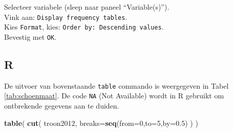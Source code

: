 \documentclass[
]{book}
\newenvironment{Shaded}{\begin{snugshade}}{\end{snugshade}}
\newcommand{\CommentTok}[1]{\textcolor[rgb]{0.56,0.35,0.01}{\textit{#1}}}
\newcommand{\DataTypeTok}[1]{\textcolor[rgb]{0.13,0.29,0.53}{#1}}
\newcommand{\DecValTok}[1]{\textcolor[rgb]{0.00,0.00,0.81}{#1}}
\newcommand{\FloatTok}[1]{\textcolor[rgb]{0.00,0.00,0.81}{#1}}
\newcommand{\KeywordTok}[1]{\textcolor[rgb]{0.13,0.29,0.53}{\textbf{#1}}}
\newcommand{\NormalTok}[1]{#1}
\newcommand{\OperatorTok}[1]{\textcolor[rgb]{0.81,0.36,0.00}{\textbf{#1}}}
\newcommand{\OtherTok}[1]{\textcolor[rgb]{0.56,0.35,0.01}{#1}}
\newcommand{\StringTok}[1]{\textcolor[rgb]{0.31,0.60,0.02}{#1}}
\begin{document}
Selecteer variabele (sleep naar paneel ``Variable(s)'').\\
Vink aan: \texttt{Display\ frequency\ tables}.\\
Kies \texttt{Format}, kies: \texttt{Order\ by:\ Descending\ values}.\\
Bevestig met \texttt{OK}.\\

\hypertarget{r-1}{%
\subsection{R}\label{r-1}}

\begin{Shaded}
\end{Shaded}

De uitvoer van bovenstaande \texttt{table} commando is weergegeven in Tabel \ref{tab:schoenmaat}.
De code \texttt{NA} (Not Available) wordt in R gebruikt om ontbrekende gegevens aan te duiden.

\begin{Shaded}
\end{Shaded}

\begin{Shaded}
\begin{Highlighting}[]
\KeywordTok{table}\NormalTok{( }\KeywordTok{cut}\NormalTok{( troon2012, }\DataTypeTok{breaks=}\KeywordTok{seq}\NormalTok{(}\DataTypeTok{from=}\DecValTok{0}\NormalTok{,}\DataTypeTok{to=}\DecValTok{5}\NormalTok{,}\DataTypeTok{by=}\FloatTok{0.5}\NormalTok{) ) )}
\end{Highlighting}
\end{Shaded}
\end{document}
